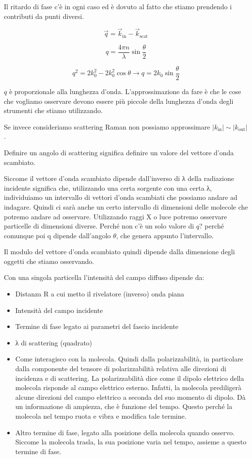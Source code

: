 Il ritardo di fase c'è in ogni caso ed è dovuto al fatto che stiamo
prendendo i contributi da punti diversi.

\[\overrightarrow{q} = {\overrightarrow{k}}_{\text{in}} - {\overrightarrow{k}}_{\text{scat}}\]

\[q = \frac{4\pi n}{\lambda}\sin\frac{\theta}{2}\]

\[q^{2} = 2k_{0}^{2} - 2k_{0}^{2}\cos\theta \rightarrow q = 2k_{0}\sin\frac{\theta}{2}\]

\(q\) è proporzionale alla lunghezza d'onda. L'approssimazione da fare è
che le cose che vogliamo osservare devono essere più piccole della
lunghezza d'onda degli strumenti che stiamo utilizzando.

Se invece consideriamo scattering Raman non possiamo approssimare
\(\left| k_{\text{in}} \right| \sim \left| k_{\text{out}} \right|\).

Definire un angolo di scattering significa definire un valore del
vettore d'onda scambiato.

Siccome il vettore d'onda scambiato dipende dall'inverso di λ della
radiazione incidente significa che, utilizzando una certa sorgente con
una certa λ, individuiamo un intervallo di vettori d'onda scambiati che
possiamo andare ad indagare. Quindi ci sarà anche un certo intervallo di
dimensioni delle molecole che potremo andare ad osservare. Utilizzando
raggi X o luce potremo osservare particelle di dimensioni diverse.
Perché non c'è un solo valore di \(q\)? perché comunque poi q dipende
dall'angolo \(\theta\), che genera appunto l'intervallo.

Il modulo del vettore d'onda scambiato quindi dipende dalla dimensione
degli oggetti che stiamo osservando.

Con una singola particella l'intensità del campo diffuso dipende da:

\begin{itemize}
\item
  Distanza R a cui metto il rivelatore (inverso) onda piana
\item
  Intensità del campo incidente
\item
  Termine di fase legato ai parametri del fascio incidente
\item
  λ di scattering (quadrato)
\item
  Come interagisco con la molecola. Quindi dalla polarizzabilità, in
  particolare dalla componente del tensore di polarizzabilità relativa
  alle direzioni di incidenza e di scattering. La polarizzabilità dice
  come il dipolo elettrico della molecola risponde al campo elettrico
  esterno. Infatti, la molecola prediligerà alcune direzioni del campo
  elettrico a seconda del suo momento di dipolo. Dà un informazione di
  ampiezza, che è funzione del tempo. Questo perché la molecola nel
  tempo ruota e vibra e modifica tale termine.
\item
  Altro termine di fase, legato alla posizione della molecola quando
  osservo. Siccome la molecola trasla, la sua posizione varia nel tempo,
  assieme a questo termine di fase.
\end{itemize}


